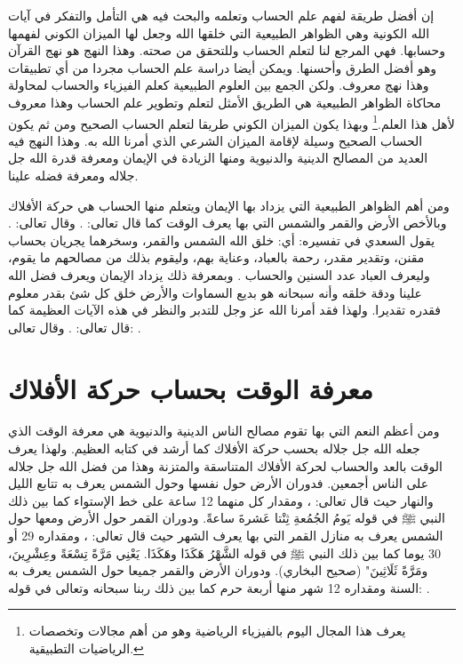 إن أفضل طريقة لفهم علم الحساب وتعلمه والبحث فيه هي التأمل والتفكر في آيات الله الكونية وهي الظواهر الطبيعية التي خلقها الله وجعل لها الميزان الكوني لفهمها وحسابها. فهي المرجع لنا لتعلم الحساب وللتحقق من صحته. وهذا النهج هو نهج القرآن وهو أفضل الطرق وأحسنها. ويمكن أيضا دراسة علم الحساب مجردا من أي تطبيقات وهذا نهج معروف. ولكن الجمع بين العلوم الطبيعية كعلم الفيزياء والحساب لمحاولة محاكاة الظواهر الطبيعية هي الطريق الأمثل لتعلم وتطوير علم الحساب وهذا معروف لأهل هذا العلم.\footnote{يعرف هذا المجال اليوم بالفيزياء الرياضية وهو من أهم مجالات وتخصصات الرياضيات التطبيقية.} وبهذا يكون الميزان الكوني طريقا لتعلم الحساب الصحيح ومن ثم يكون الحساب الصحيح وسيلة لإقامة الميزان الشرعي الذي أمرنا الله به. وهذا النهج فيه العديد من المصالح الدينية والدنيوية ومنها الزيادة في الإيمان ومعرفة قدرة الله جل جلاله ومعرفة فضله علينا.

ومن أهم الظواهر الطبيعية التي يزداد بها الإيمان ويتعلم منها الحساب هي حركة الأفلاك وبالأخص الأرض والقمر والشمس التي بها يعرف الوقت كما قال تعالى: \quranayah*[21][33]{\footnotesize \surahname*[21]}. وقال تعالى: \quranayah*[55][5]{\footnotesize \surahname*[55]}. يقول السعدي في تفسيره: أي: خلق الله الشمس والقمر، وسخرهما يجريان بحساب مقنن، وتقدير مقدر، رحمة بالعباد، وعناية بهم، وليقوم بذلك من مصالحهم ما يقوم، وليعرف العباد عدد السنين والحساب \href{https://shamela.ws/book/42/1887#p6}{\faExternalLink} \cite{tafsir_Saadi}. وبمعرفة ذلك يزداد الإيمان ويعرف فضل الله علينا ودقة خلقه وأنه سبحانه هو بديع السماوات والأرض خلق كل شئ بقدر معلوم فقدره تقديرا. ولهذا فقد أمرنا الله عز وجل للتدبر والنظر في هذه الآيات العظيمة كما قال تعالى: \quranayah*[16][12]{\footnotesize \surahname*[16]}. وقال تعالى: \quranayah*[36][40]{\footnotesize \surahname*[36]}. 

\section{معرفة الوقت بحساب حركة الأفلاك}

ومن أعظم النعم التي بها تقوم مصالح الناس الدينية والدنيوية هي معرفة الوقت الذي جعله الله جل جلاله بحسب حركة الأفلاك كما أرشد في كتابه العظيم. ولهذا يعرف الوقت بالعد والحساب لحركة الأفلاك المتناسقة والمتزنة وهذا من فضل الله جل جلاله على الناس أجمعين. فدوران الأرض حول نفسها وحول الشمس يعرف به تتابع الليل والنهار حيث قال تعالى: \quranayah*[25][62]{\footnotesize \surahname*[25]}، ومقدار كل منهما 12 ساعة على خط الإستواء كما بين ذلك النبي ﷺ في قوله يَومُ الجُمُعةِ ثِنْتا عَشرةَ ساعةً. ودوران القمر حول الأرض ومعها حول الشمس يعرف به منازل القمر التي بها يعرف الشهر حيث قال تعالى: \quranayah*[36][39]{\footnotesize \surahname*[36]}، ومقداره 29 أو 30 يوما كما بين ذلك النبي ﷺ في قوله الشَّهْرُ هَكَذَا وهَكَذَا. يَعْنِي مَرَّةً تِسْعَةً وعِشْرِينَ، ومَرَّةً ثَلَاثِينَ" {\footnotesize (صحيح البخاري)}. ودوران الأرض والقمر جميعا حول الشمس يعرف به السنة ومقداره 12 شهر منها أربعة حرم كما بين ذلك ربنا سبحانه وتعالى في قوله: \quranayah*[9][36]{\footnotesize \surahname*[9]}. 

